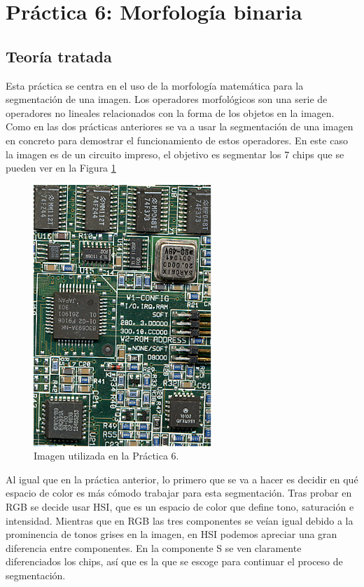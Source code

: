 \documentclass[a4paper,12pt]{report}
\begin{document}
\section{ Práctica 6: Morfología binaria}
\subsection{Teoría tratada}

Esta práctica se centra en el uso de la morfología matemática para la segmentación de una imagen. Los operadores morfológicos son una serie de operadores no lineales relacionados con la forma de los objetos en la imagen. Como en las dos prácticas anteriores se va a usar la segmentación de una imagen en concreto para demostrar el funcionamiento de estos operadores. En este caso la imagen es de un circuito impreso, el objetivo es segmentar los 7 chips que se pueden ver en la Figura \ref{placa}\\

\begin{figure}[h]
\centering
\includegraphics[width=0.6\textwidth]{imagenes/placa}
\caption{Imagen utilizada en la Práctica 6.}
\label{placa}
\end{figure}

Al igual que en la práctica anterior, lo primero que se va a hacer es decidir en qué espacio de color es más cómodo trabajar para esta segmentación. Tras probar en RGB se decide usar HSI, que es un espacio de color que define tono, saturación e intensidad. Mientras que en RGB las tres componentes se veían igual debido a la prominencia de tonos grises en la imagen, en HSI podemos apreciar una gran diferencia entre componentes. En la componente S se ven claramente diferenciados los chips, así que es la que se escoge para continuar el proceso de segmentación.\\
\end{document}
